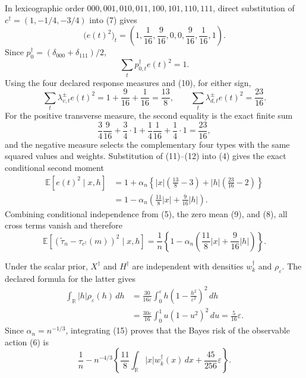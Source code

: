 In lexicographic order \(000,001,010,011,100,101,110,111\), direct substitution of
\(c^\dagger=(1,-1/4,-3/4)\) into (7) gives
\[
\bigl(e(t)^2\bigr)_t
=\left(1,\frac1{16},\frac9{16},0,0,
\frac9{16},\frac1{16},1\right).
\tag{10}
\]
Since \(p_0^\dagger=(\delta_{000}+\delta_{111})/2\),
\[
\sum_t p_{0,t}^\dagger e(t)^2=1.
\tag{11}
\]
Using the four declared response measures and (10), for either sign,
\[
\sum_t\lambda_{v,t}^{\pm}e(t)^2
=1+\frac9{16}+\frac1{16}=\frac{13}{8},
\qquad
\sum_t\lambda_{d,t}^{\pm}e(t)^2=\frac{23}{16}.
\tag{12}
\]
For the positive transverse measure, the second equality is the exact finite sum
\[
\frac34\frac9{16}+\frac34\cdot1
+\frac14\frac1{16}+\frac14\cdot1=\frac{23}{16},
\tag{13}
\]
and the negative measure selects the complementary four types with the same squared values and weights.  Substitution of (11)--(12) into (4) gives the exact conditional second moment
\[
\begin{aligned}
\mathbb E[e(t)^2\mid x,h]
&=1+\alpha_n\left\{
|x|\left(\frac{13}{8}-3\right)
+|h|\left(\frac{23}{16}-2\right)\right\}\\
&=1-\alpha_n\left(\frac{11}{8}|x|+\frac9{16}|h|\right).
\end{aligned}
\tag{14}
\]
Combining conditional independence from (5), the zero mean (9), and (8), all cross terms vanish and therefore
\[
\mathbb E\left[
(\widetilde\tau_n-\tau_{c^\dagger}(m))^2\mid x,h\right]
=\frac1n\left\{1-\alpha_n\left(
\frac{11}{8}|x|+\frac9{16}|h|\right)\right\}.
\tag{15}
\]

Under the scalar prior, \(X^\dagger\) and \(H^\dagger\) are independent with densities \(w_k^\dagger\) and \(\rho_\varepsilon\).  The declared formula for the latter gives
\[
\begin{aligned}
\int_{\mathbb R}|h|\rho_\varepsilon(h)\,dh
&=\frac{30}{16\varepsilon}\int_0^\varepsilon
h\left(1-\frac{h^2}{\varepsilon^2}\right)^2\,dh\\
&=\frac{30\varepsilon}{16}\int_0^1u(1-u^2)^2\,du
=\frac5{16}\varepsilon.
\end{aligned}
\tag{16}
\]
Since \(\alpha_n=n^{-1/3}\), integrating (15) proves that the Bayes risk of the observable action (6) is
\[
\frac1n-n^{-4/3}\left\{
\frac{11}{8}\int_{\mathbb R}|x|w_k^\dagger(x)\,dx
+\frac{45}{256}\varepsilon\right\}.
\tag{17}
\]

